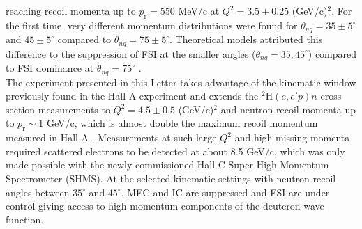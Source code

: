 reaching recoil momenta up to $p_{\mathrm{r}}=550$ MeV/c at $Q^{2}=3.5\pm0.25$ (GeV/c)$^{2}$. For the first time, very different momentum distributions were found for $\theta_{nq}=35\pm5^{\circ}$
and $45\pm5^{\circ}$ compared to  $\theta_{nq}=75\pm5^{\circ}$. Theoretical models attributed this difference  to the suppression of FSI at the smaller angles ($\theta_{nq}=35, 45^{\circ}$) compared to FSI
dominance at $\theta_{nq}=75^{\circ}$ \cite{PhysRevLett.107.262501}. \\
\indent The experiment presented in this Letter takes advantage of the kinematic window previously found in the Hall A experiment \cite{PhysRevLett.107.262501} and extends the $^{2}\mathrm{H}(e,e'p)n$ cross section measurements
to $Q^{2}=4.5\pm0.5$ (GeV/c)$^{2}$ and neutron recoil momenta up to $p_{\mathrm{r}}\sim 1$ GeV/c, which is almost double the maximum recoil momentum measured in Hall A \cite{PhysRevLett.107.262501}.
Measurements at such large $Q^{2}$ and high missing momenta required scattered electrons to be detected at about 8.5 GeV/c, which was only made possible with the newly commissioned Hall C Super High Momentum Spectrometer (SHMS).
At the selected kinematic settings with neutron recoil angles between $35^{\circ}$ and $45^{\circ}$, MEC and IC are suppressed and FSI are under control giving access to high momentum components of the deuteron wave function.


